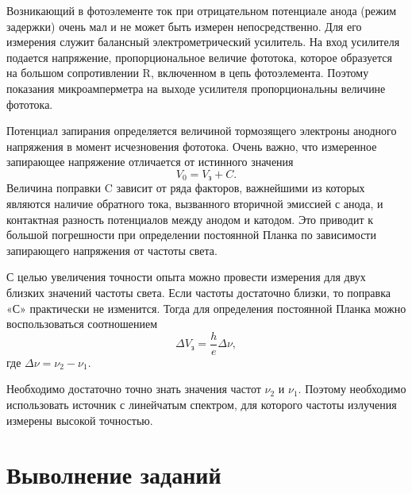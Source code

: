 \documentclass[12pt]{article}
\begin{document}
	\par Возникающий в фотоэлементе ток при отрицательном потенциале анода (режим задержки) очень мал и не может быть измерен непосредственно. Для его измерения служит балансный электрометрический усилитель. На вход усилителя подается напряжение, пропорциональное величие фототока, которое образуется на большом сопротивлении R, включенном в цепь фотоэлемента. Поэтому показания микроамперметра на выходе усилителя пропорциональны величине фототока.

	Потенциал запирания определяется величиной тормозящего электроны анодного напряжения в момент исчезновения фототока. Очень важно, что измеренное запирающее напряжение отличается от истинного значения
	\begin{equation}
		V_0 = V_\text{з} + C.
	\end{equation}
	Величина поправки C зависит от ряда факторов, важнейшими из которых являются наличие обратного тока, вызванного вторичной эмиссией с анода, и контактная разность потенциалов между анодом и катодом. Это приводит к большой погрешности при определении постоянной Планка по зависимости запирающего напряжения от частоты света.

	\par С целью увеличения точности опыта можно провести измерения для двух близких значений частоты света. Если частоты достаточно близки, то поправка «С» практически не изменится. Тогда для определения постоянной Планка можно воспользоваться соотношением 
	\begin{equation}
		\Delta V_\text{з} = \dfrac{h}{e}\Delta\nu, 
	\end{equation}
	где $\Delta\nu = \nu_2 - \nu_1$.

	Необходимо достаточно точно знать значения частот $\nu_2$ и $\nu_1$. Поэтому необходимо использовать источник с линейчатым спектром, для которого частоты излучения измерены высокой точностью.

	\section{Выволнение заданий}
\end{document}
